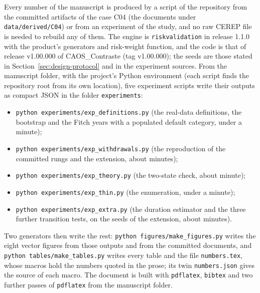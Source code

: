 Every number of the manuscript is produced by a script of the repository from the committed artifacts of the case C04 (the documents under \texttt{data/derived/C04}) or from an experiment of the study, and no raw CEREP file is needed to rebuild any of them. The engine is \texttt{riskvalidation} in release 1.1.0 with the product's generators and risk-weight function, and the code is that of release v1.00.000 of CAOS\_Contraste (tag v1.00.000); the seeds are those stated in Section~\ref{sec:design-protocol} and in the experiment sources. From the manuscript folder, with the project's Python environment (each script finds the repository root from its own location), five experiment scripts write their outputs as compact JSON in the folder \texttt{experiments}: %
\begin{itemize}
\item \texttt{python experiments/exp\_definitions.py} (the real-data definitions, the bootstrap and the Fitch years with a populated default category, under a minute);
\item \texttt{python experiments/exp\_withdrawals.py} (the reproduction of the committed rungs and the extension, about \minWd{} minutes);
\item \texttt{python experiments/exp\_theory.py} (the two-state check, about \minTheory{} minute);
\item \texttt{python experiments/exp\_thin.py} (the enumeration, under a minute);
\item \texttt{python experiments/exp\_extra.py} (the duration estimator and the three further transition tests, on the seeds of the extension, about \minExtra{} minutes).
\end{itemize}
\begin{sloppypar}
Two generators then write the rest: \texttt{python figures/make\_figures.py} writes the eight vector figures from those outputs and from the committed documents, and \texttt{python tables/make\_tables.py} writes every table and the file \texttt{numbers.tex}, whose macros hold the numbers quoted in the prose; its twin \texttt{numbers.json} gives the source of each macro. The document is built with \texttt{pdflatex}, \texttt{bibtex} and two further passes of \texttt{pdflatex} from the manuscript folder.
\end{sloppypar}
